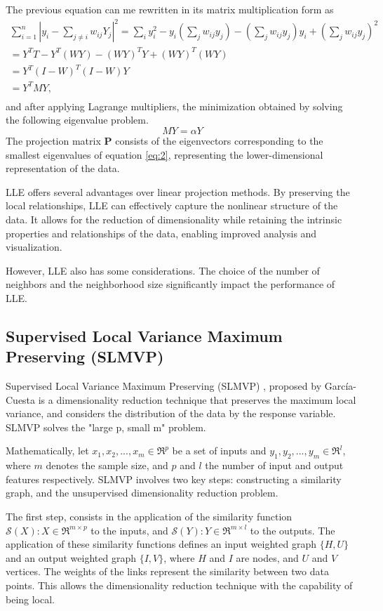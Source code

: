 The previous equation can me rewritten in its matrix multiplication form as
\begin{multline}
  \sum^n_{i=1} |y_i - \sum_{j \neq i} w_{ij} Y_j |^2 = \sum_i y_i^2 - y_i (\sum_j w_{ij}y_j) - (\sum_j w_{ij}y_j)y_i + (\sum_j w_{ij}y_j)^2 \\
  = Y^T T - Y^T (WY) - (WY)^T Y + (WY)^T (WY) \\
  = Y^T (I - W)^T (I-W)Y \\
  = Y^T M Y, \\
\end{multline}
and after applying Lagrange multipliers, the minimization obtained by solving the following eigenvalue problem.
\begin{equation} \label{eq:2}
  MY = \alpha Y
\end{equation}
The projection matrix $\mathbf{P}$ consists of the eigenvectors corresponding to the smallest eigenvalues of equation \ref{eq:2}, representing the lower-dimensional representation of the data.

LLE offers several advantages over linear projection methods. By preserving the local relationships, LLE can effectively capture the nonlinear structure of the data. It allows for the reduction of dimensionality while retaining the intrinsic properties and relationships of the data, enabling improved analysis and visualization.

However, LLE also has some considerations. The choice of the number of neighbors and the neighborhood size significantly impact the performance of LLE.

\subsection{Supervised Local Variance Maximum Preserving (SLMVP)}
Supervised Local Variance Maximum Preserving (SLMVP) \cite{slmvp}\cite{slmvp1}, proposed by García-Cuesta is a dimensionality reduction technique that preserves the maximum local variance, and considers the distribution of the data by the response variable. SLMVP solves the "large p, small m" problem.

Mathematically, let $x_1, x_2, ..., x_m \in \mathfrak{R}^p$ be a set of inputs and $y_1, y_2, ..., y_m \in \mathfrak{R}^l$, where $m$ denotes the sample size, and $p$ and $l$ the number of input and output features respectively. SLMVP involves two key steps: constructing a similarity graph, and the unsupervised dimensionality reduction problem.

The first step, consists in the application of the similarity function $\mathscr{S}(X) : X \in \mathfrak{R}^{m \times p}$ to the inputs, and $\mathscr{S}(Y) : Y \in \mathfrak{R}^{m \times l}$ to the outputs. The application of these similarity functions defines an input weighted graph $\{H, U\}$ and an output weighted graph $\{I, V\}$, where $H$ and $I$ are nodes, and $U$ and $V$ vertices. The weights of the links represent the similarity between two data points. This allows the dimensionality reduction technique with the capability of being local.

